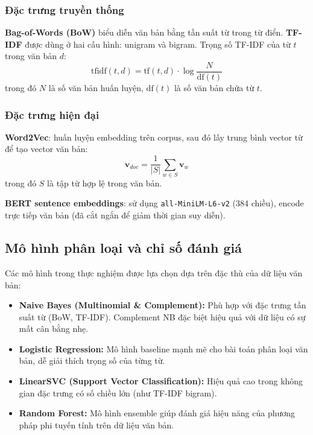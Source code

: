 \subsubsection{Đặc trưng truyền thống}
\textbf{Bag-of-Words (BoW)} biểu diễn văn bản bằng tần suất từ trong từ điển. \textbf{TF-IDF} được dùng ở hai cấu hình: unigram và bigram. Trọng số TF-IDF của từ $t$ trong văn bản $d$:
\begin{equation}
\mathrm{tfidf}(t,d) = \mathrm{tf}(t,d) \cdot \log\frac{N}{\mathrm{df}(t)}
\end{equation}
trong đó $N$ là số văn bản huấn luyện, $\mathrm{df}(t)$ là số văn bản chứa từ $t$.

\subsubsection{Đặc trưng hiện đại}
\textbf{Word2Vec}: huấn luyện embedding trên corpus, sau đó lấy trung bình vector từ để tạo vector văn bản:
\begin{equation}
\mathbf{v}_{doc} = \frac{1}{|S|}\sum_{w \in S}\mathbf{v}_w
\end{equation}
trong đó $S$ là tập từ hợp lệ trong văn bản.

\textbf{BERT sentence embeddings}: sử dụng \texttt{all-MiniLM-L6-v2} (384 chiều), encode trực tiếp văn bản (đã cắt ngắn để giảm thời gian suy diễn).

\subsection{Mô hình phân loại và chỉ số đánh giá}
Các mô hình trong thực nghiệm được lựa chọn dựa trên đặc thù của dữ liệu văn bản:
\begin{itemize}[nosep]
    \item \textbf{Naive Bayes (Multinomial \& Complement):} Phù hợp với đặc trưng tần suất từ (BoW, TF-IDF). Complement NB đặc biệt hiệu quả với dữ liệu có sự mất cân bằng nhẹ.
    \item \textbf{Logistic Regression:} Mô hình baseline mạnh mẽ cho bài toán phân loại văn bản, dễ giải thích trọng số của từng từ.
    \item \textbf{LinearSVC (Support Vector Classification):} Hiệu quả cao trong không gian đặc trưng có số chiều lớn (như TF-IDF bigram).
    \item \textbf{Random Forest:} Mô hình ensemble giúp đánh giá hiệu năng của phương pháp phi tuyến tính trên dữ liệu văn bản.
\end{itemize}

